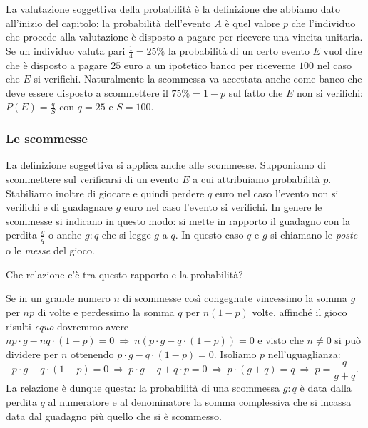 La valutazione soggettiva della probabilità è la definizione che abbiamo dato all'inizio del capitolo: la probabilità dell'evento $A$ è quel valore $p$ che l'individuo che procede alla valutazione è disposto a pagare per ricevere una vincita unitaria. Se un individuo valuta pari $\frac 1 4=25\%$ la probabilità di un certo evento $E$ vuol dire che è disposto a pagare $25$ euro a un ipotetico banco per riceverne $100$ nel caso che $E$ si verifichi. Naturalmente la scommessa va accettata anche come banco che deve essere disposto a scommettere il $75\%=1-p$ sul fatto che $E$ non si verifichi: $P(E)=\frac q S$ con $ q=25 $ e $S=100$.

\subsubsection*{Le scommesse}

La definizione soggettiva si applica anche alle scommesse. Supponiamo di scommettere sul verificarsi di un evento $E$ a cui attribuiamo probabilità $p$. Stabiliamo inoltre di giocare e quindi perdere $q$ euro nel caso l'evento non si verifichi e di guadagnare $g$ euro nel caso l'evento si verifichi. In genere le scommesse si indicano in questo modo: si mette in rapporto il guadagno con la perdita $\frac g q$ o anche $g:q$ che si legge $g$ a $q$. In questo caso $q$ e $g$ si chiamano le \emph{poste} o le \emph{messe} del gioco.


Che relazione c'è tra questo rapporto e la probabilità?

Se in un grande numero $n$ di scommesse così congegnate vincessimo la somma $g$ per $np$ di volte e perdessimo la somma $q$ per $n(1-p)$ volte, affinché il gioco risulti \emph{equo} dovremmo avere $np\cdot g-nq\cdot (1-p)=0 \:\Rightarrow\: n(p\cdot g-q\cdot (1-p))=0$ e visto che $n\neq 0$ si può dividere per $n$ ottenendo $p\cdot g-q\cdot (1-p)=0$. Isoliamo $p$ nell'uguaglianza:
\begin{equation*}
p\cdot g-q\cdot (1-p)=0 \:\Rightarrow\: p\cdot g-q+q\cdot p=0\:\Rightarrow\: p\cdot (g+q)=q \:\Rightarrow\: p=\frac q{g+q}.
\end{equation*}
La relazione è dunque questa: la probabilità di una scommessa $g:q$ è data dalla perdita $q$ al numeratore e al denominatore la somma complessiva che si incassa data dal guadagno più quello che si è scommesso.


